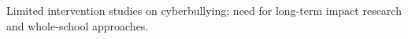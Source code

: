 Limited intervention studies on cyberbullying; need for long-term impact research and whole-school approaches.